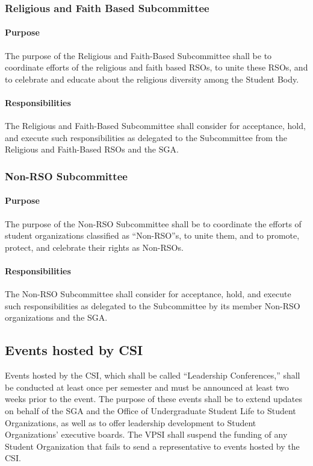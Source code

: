 \documentclass[12pt]{scrreprt}
\begin{document}
\subsubsection{Religious and Faith Based Subcommittee}

\paragraph{Purpose}
​The purpose of the Religious and Faith-Based Subcommittee shall be to
coordinate efforts of the religious and faith based RSOs, to unite these RSOs, and to
celebrate and educate about the religious diversity among the Student Body.

\paragraph{Responsibilities}
The Religious and Faith-Based Subcommittee shall consider for
acceptance, hold, and execute such responsibilities as delegated to the Subcommittee from
the Religious and Faith-Based RSOs and the SGA.

\subsubsection{Non-RSO Subcommittee}

\paragraph{Purpose}
​The purpose of the Non-RSO Subcommittee shall be to coordinate the efforts of
student organizations classified as “Non-RSO”s, to unite them, and to promote, protect, and
celebrate their rights as Non-RSOs.

\paragraph{Responsibilities}
The Non-RSO Subcommittee shall consider for acceptance, hold, and
execute such responsibilities as delegated to the Subcommittee by its member Non-RSO
organizations and the SGA.

\subsection{Events hosted by CSI}
Events hosted by the CSI, which shall be called “Leadership Conferences,” shall be
conducted at least once per semester and must be announced at least two weeks prior to
the event. The purpose of these events shall be to extend updates on behalf of the SGA
and the Office of Undergraduate Student Life to Student Organizations, as well as to offer
leadership development to Student Organizations’ executive boards. The VPSI shall
suspend the funding of any Student Organization that fails to send a representative to
events hosted by the CSI.
\end{document}
